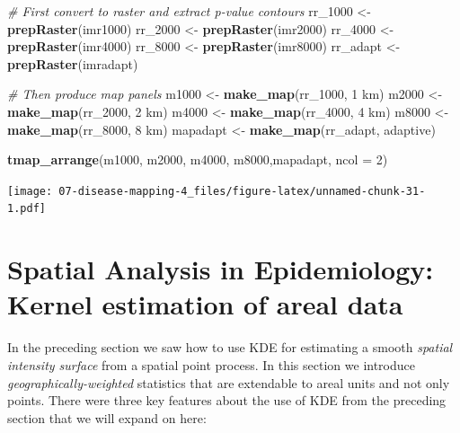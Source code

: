 \documentclass[
]{book}
\newenvironment{Shaded}{\begin{snugshade}}{\end{snugshade}}
\newcommand{\AttributeTok}[1]{\textcolor[rgb]{0.13,0.29,0.53}{#1}}
\newcommand{\CommentTok}[1]{\textcolor[rgb]{0.56,0.35,0.01}{\textit{#1}}}
\newcommand{\DecValTok}[1]{\textcolor[rgb]{0.00,0.00,0.81}{#1}}
\newcommand{\FunctionTok}[1]{\textcolor[rgb]{0.13,0.29,0.53}{\textbf{#1}}}
\newcommand{\NormalTok}[1]{#1}
\newcommand{\OtherTok}[1]{\textcolor[rgb]{0.56,0.35,0.01}{#1}}
\newcommand{\StringTok}[1]{\textcolor[rgb]{0.31,0.60,0.02}{#1}}
\begin{document}
\begin{Shaded}
\begin{Highlighting}[]
\CommentTok{\# First convert to raster and extract p{-}value contours}
\NormalTok{rr\_1000 }\OtherTok{\textless{}{-}} \FunctionTok{prepRaster}\NormalTok{(imr1000)}
\NormalTok{rr\_2000 }\OtherTok{\textless{}{-}} \FunctionTok{prepRaster}\NormalTok{(imr2000)}
\NormalTok{rr\_4000 }\OtherTok{\textless{}{-}} \FunctionTok{prepRaster}\NormalTok{(imr4000)}
\NormalTok{rr\_8000 }\OtherTok{\textless{}{-}} \FunctionTok{prepRaster}\NormalTok{(imr8000)}
\NormalTok{rr\_adapt }\OtherTok{\textless{}{-}} \FunctionTok{prepRaster}\NormalTok{(imradapt)}

\CommentTok{\# Then produce map panels}
\NormalTok{m1000 }\OtherTok{\textless{}{-}} \FunctionTok{make\_map}\NormalTok{(rr\_1000, }\StringTok{\textquotesingle{}1 km\textquotesingle{}}\NormalTok{)}
\NormalTok{m2000 }\OtherTok{\textless{}{-}} \FunctionTok{make\_map}\NormalTok{(rr\_2000, }\StringTok{\textquotesingle{}2 km\textquotesingle{}}\NormalTok{)}
\NormalTok{m4000 }\OtherTok{\textless{}{-}} \FunctionTok{make\_map}\NormalTok{(rr\_4000, }\StringTok{\textquotesingle{}4 km\textquotesingle{}}\NormalTok{)}
\NormalTok{m8000 }\OtherTok{\textless{}{-}} \FunctionTok{make\_map}\NormalTok{(rr\_8000, }\StringTok{\textquotesingle{}8 km\textquotesingle{}}\NormalTok{)}
\NormalTok{mapadapt }\OtherTok{\textless{}{-}} \FunctionTok{make\_map}\NormalTok{(rr\_adapt, }\StringTok{\textquotesingle{}adaptive\textquotesingle{}}\NormalTok{)}

\FunctionTok{tmap\_arrange}\NormalTok{(m1000, m2000, m4000, m8000,mapadapt, }\AttributeTok{ncol =} \DecValTok{2}\NormalTok{)}
\end{Highlighting}
\end{Shaded}

\texttt{[image: 07-disease-mapping-4\_files/figure-latex/unnamed-chunk-31-1.pdf]}

\hypertarget{gwss}{%
\section{Spatial Analysis in Epidemiology: Kernel estimation of areal data}\label{gwss}}

In the preceding section we saw how to use KDE for estimating a smooth \emph{spatial intensity surface} from a spatial point process. In this section we introduce \emph{geographically-weighted} statistics that are extendable to areal units and not only points. There were three key features about the use of KDE from the preceding section that we will expand on here:
\end{document}
